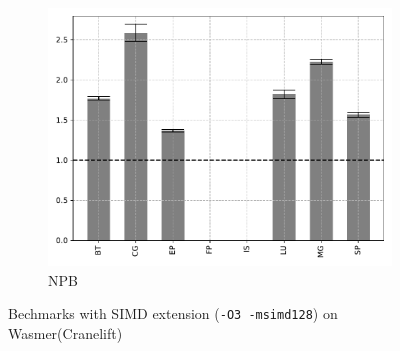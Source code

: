 \begin{figure}
\begin{subfigure}[t]{.45\textwidth}
        \includegraphics[width=\textwidth]
        {Images/6.1.RQ1/npb-wasmer-cranelift-simd.pdf}
        \caption{NPB}
    \end{subfigure}
    \caption{Bechmarks with SIMD extension (\texttt{-O3 -msimd128}) on Wasmer(Cranelift)}
\end{figure}

